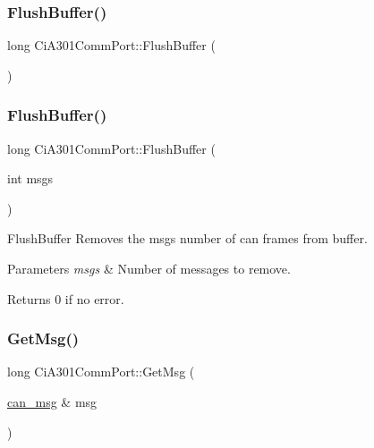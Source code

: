 \mbox{\label{classCiA301CommPort_a067cddaf01932fa6fa27255c61b08190}} 
\subsubsection{\texorpdfstring{Flush\+Buffer()}{FlushBuffer()}\hspace{0.1cm}{\footnotesize\ttfamily [1/2]}}
{\footnotesize\ttfamily long Ci\+A301\+Comm\+Port\+::\+Flush\+Buffer (\begin{DoxyParamCaption}{ }\end{DoxyParamCaption})}

\mbox{\label{classCiA301CommPort_ab29e221039a2d21d1446edb09b91864e}} 
\subsubsection{\texorpdfstring{Flush\+Buffer()}{FlushBuffer()}\hspace{0.1cm}{\footnotesize\ttfamily [2/2]}}
{\footnotesize\ttfamily long Ci\+A301\+Comm\+Port\+::\+Flush\+Buffer (\begin{DoxyParamCaption}\item[{int}]{msgs }\end{DoxyParamCaption})}



Flush\+Buffer Removes the msgs number of can frames from buffer. 


\begin{DoxyParams}{Parameters}
{\em msgs} & Number of messages to remove. \\
\hline
\end{DoxyParams}
\begin{DoxyReturn}{Returns}
0 if no error. 
\end{DoxyReturn}
\mbox{\label{classCiA301CommPort_a645450ca09e07ea6da339923ceeec934}} 
\subsubsection{\texorpdfstring{Get\+Msg()}{GetMsg()}}
{\footnotesize\ttfamily long Ci\+A301\+Comm\+Port\+::\+Get\+Msg (\begin{DoxyParamCaption}\item[{\hyperlink{structcan__msg}{can\+\_\+msg} \&}]{msg }\end{DoxyParamCaption})\hspace{0.3cm}{\ttfamily [private]}}

